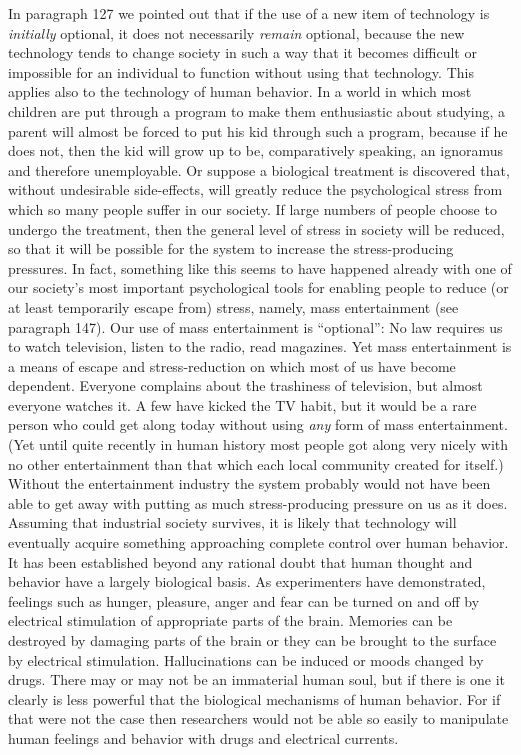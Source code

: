  In paragraph 127 we pointed out that if the use of a new item of technology is {\em initially} optional, it does not necessarily {\em remain} optional, because the new technology tends to change society in such a way that it becomes difficult or impossible for an individual to function without using that technology. This applies also to the technology of human behavior. In a world in which most children are put through a program to make them enthusiastic about studying, a parent will almost be forced to put his kid through such a program, because if he does not, then the kid will grow up to be, comparatively speaking, an ignoramus and therefore unemployable. Or suppose a biological treatment is discovered that, without undesirable side-effects, will greatly reduce the psychological stress from which so many people suffer in our society. If large numbers of people choose to undergo the treatment, then the general level of stress in society will be reduced, so that it will be possible for the system to increase the stress-producing pressures. In fact, something like this seems to have happened already with one of our society’s most important psychological tools for enabling people to reduce (or at least temporarily escape from) stress, namely, mass entertainment (see paragraph 147). Our use of mass entertainment is “optional”: No law requires us to watch television, listen to the radio, read magazines. Yet mass entertainment is a means of escape and stress-reduction on which most of us have become dependent. Everyone complains about the trashiness of television, but almost everyone watches it. A few have kicked the TV habit, but it would be a rare person who could get along today without using {\em any} form of mass entertainment. (Yet until quite recently in human history most people got along very nicely with no other entertainment than that which each local community created for itself.) Without the entertainment industry the system probably would not have been able to get away with putting as much stress-producing pressure on us as it does.
 Assuming that industrial society survives, it is likely that technology will eventually acquire something approaching complete control over human behavior. It has been established beyond any rational doubt that human thought and behavior have a largely biological basis. As experimenters have demonstrated, feelings such as hunger, pleasure, anger and fear can be turned on and off by electrical stimulation of appropriate parts of the brain. Memories can be destroyed by damaging parts of the brain or they can be brought to the surface by electrical stimulation. Hallucinations can be induced or moods changed by drugs. There may or may not be an immaterial human soul, but if there is one it clearly is less powerful that the biological mechanisms of human behavior. For if that were not the case then researchers would not be able so easily to manipulate human feelings and behavior with drugs and electrical currents.
